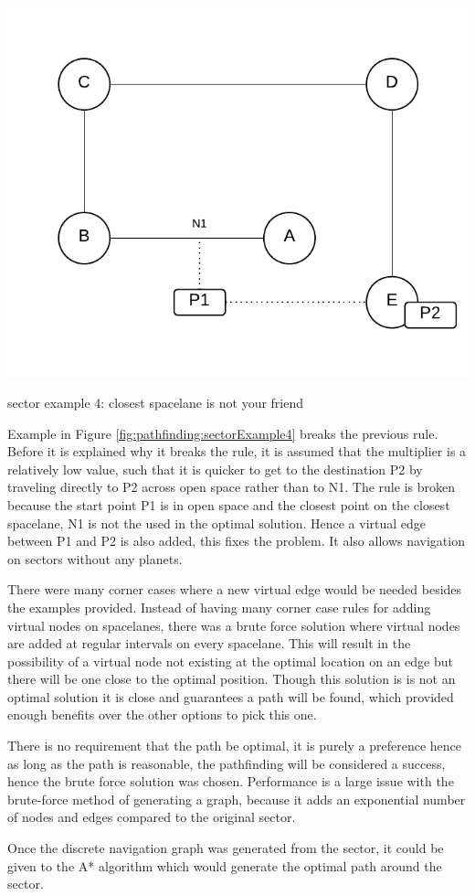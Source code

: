 \begin{marginfigure}
	\includegraphics{res/pathfinding/PathFindingSector4.pdf}
    \caption{sector example 4: closest spacelane is not your friend}
	\label{fig:pathfinding:sectorExample4}
\end{marginfigure}

Example in Figure \ref{fig:pathfinding:sectorExample4} breaks the previous rule.
Before it is explained why it breaks the rule, it is assumed that the multiplier is a relatively low value, such that it is quicker to get to the destination P2 by traveling directly to P2 across open space rather than to N1.
The rule is broken because the start point P1 is in open space and the closest point on the closest spacelane, N1 is not the used in the optimal solution.
Hence a virtual edge between P1 and P2 is also added, this fixes the problem.
It also allows navigation on sectors without any planets.

There were many corner cases where a new virtual edge would be needed besides the examples provided.
Instead of having many corner case rules for adding virtual nodes on spacelanes, there was a brute force solution where virtual nodes are added at regular intervals on every spacelane. 
This will result in the possibility of a virtual node not existing at the optimal location on an edge but there will be one close to the optimal position.
Though this solution is is not an optimal solution it is close and guarantees a path will be found, which provided enough benefits over the other options to pick this one.

There is no requirement that the path be optimal, it is purely a preference hence as long as the path is reasonable, the pathfinding will be considered a success, hence the brute force solution was chosen.
Performance is a large issue with the brute-force method of generating a graph, because it adds an exponential number of nodes and edges compared to the original sector. 

Once the discrete navigation graph was generated from the sector, it could be given to the A* algorithm which would generate the optimal path around the sector.


